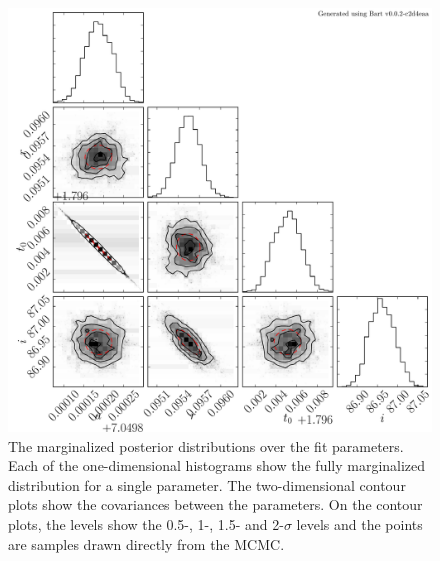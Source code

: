 \documentclass[12pt,preprint]{aastex}
\newcommand{\figlabel}[1]{\label{fig:#1}}
\begin{document}
\begin{figure}[htbp]
    \begin{center}
        \includegraphics[width=\textwidth]{figures/k6-corner.pdf}
    \end{center}
    \caption{The marginalized posterior distributions over the fit parameters.
        Each of the one-dimensional histograms show the fully marginalized
        distribution for a single parameter. The two-dimensional contour plots
        show the covariances between the parameters. On the contour plots, the
        levels show the 0.5-, 1-, 1.5- and 2-$\sigma$ levels and the points
        are samples drawn directly from the MCMC. \figlabel{k6-corner}}
\end{figure}
\end{document}
